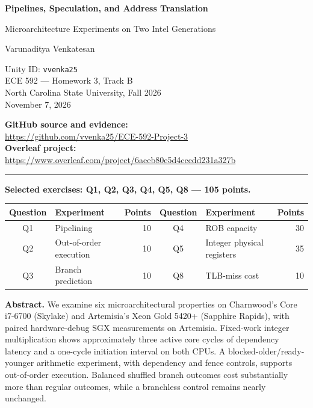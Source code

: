 \documentclass[11pt,letterpaper]{article}
\begin{document}
\begin{center}
{\LARGE\bfseries Pipelines, Speculation, and Address Translation\par}
\vspace{5pt}
{\large Microarchitecture Experiments on Two Intel Generations\par}
\vspace{12pt}
{\large Varunaditya Venkatesan\par}
Unity ID: \texttt{vvenka25}\\
ECE 592 --- Homework 3, Track B\\
North Carolina State University, Fall 2026\\
November 7, 2026
\vspace{9pt}

\textbf{GitHub source and evidence:}\\
\url{https://github.com/vvenka25/ECE-592-Project-3}\\[3pt]
\textbf{Overleaf project:}\\
\url{https://www.overleaf.com/project/6aeeb80e5d4ccedd231a327b}
\end{center}
\vspace{2pt}\hrule\vspace{6pt}
\textbf{Selected exercises: Q1, Q2, Q3, Q4, Q5, Q8 --- 105 points.}
\begin{center}\small
\begin{tabular}{clrc lr}
\toprule
Question & Experiment & Points & Question & Experiment & Points\\
\midrule
Q1 & Pipelining & 10 & Q4 & ROB capacity & 30\\
Q2 & Out-of-order execution & 10 & Q5 & Integer physical registers & 35\\
Q3 & Branch prediction & 10 & Q8 & TLB-miss cost & 10\\
\bottomrule
\end{tabular}
\end{center}
\textbf{Abstract.}
We examine six microarchitectural properties on Charnwood's Core i7-6700
(Skylake) and Artemisia's Xeon Gold 5420+ (Sapphire Rapids), with paired
hardware-debug SGX measurements on Artemisia. Fixed-work integer multiplication
shows approximately three active core cycles of dependency latency and a
one-cycle initiation interval on both CPUs. A blocked-older/ready-younger
arithmetic experiment, with dependency and fence controls, supports out-of-order
execution. Balanced shuffled branch outcomes cost substantially more than
regular outcomes, while a branchless control remains nearly unchanged.
\end{document}
